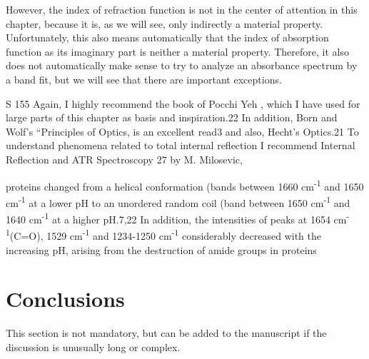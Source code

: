\documentclass[foods,article,submit,moreauthors,pdftex]{Definitions/mdpi}
\begin{document}
However, the index of refraction function is not in the center of 
attention in this chapter, because it is, as we will see, only indirectly a material property. 
Unfortunately, this also means automatically that the index of absorption function as its imaginary 
part is neither a material property. Therefore, it also does not automatically make sense to try to 
analyze an absorbance spectrum by a band fit, but we will see that there are important exceptions. 

S 155
Again, I highly recommend the book of Pocchi Yeh\textit{} , which I have 
used for large parts of this chapter as basis and inspiration.22 In addition, Born and Wolf’s “Principles 
of Optics, is an excellent read3 and also, Hecht’s Optics.21 To understand phenomena related to 
total internal reflection I recommend Internal Reflection and ATR Spectroscopy
27 by M. Milosevic, 

proteins changed from a helical conformation (bands between 1660 cm\textsuperscript{-1} and 1650 cm\textsuperscript{-1} at a lower pH to an unordered random coil (band between 1650 cm\textsuperscript{-1}
and 1640 cm\textsuperscript{-1}  at a higher pH.7,22 In addition, the intensities of peaks at 1654 cm\textsuperscript{-1}(C=O), 1529 cm\textsuperscript{-1} and 1234-1250 cm\textsuperscript{-1}  considerably decreased with the increasing pH, arising from the destruction of amide groups in proteins \cite{Wang_pH_EPS:_2012}


\section{Conclusions}

This section is not mandatory, but can be added to the manuscript if the discussion is unusually long or complex.



\vspace{6pt} 

\end{document}
